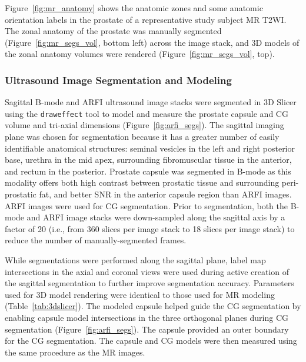 

Figure~\ref{fig:mr_anatomy} shows the anatomic zones and some anatomic
orientation labels in the prostate of a representative study subject MR T2WI.
The zonal anatomy of the prostate was manually segmented
(Figure~\ref{fig:mr_segs_vol}, bottom left) across the image stack, and 3D
models of the zonal anatomy volumes were rendered
(Figure~\ref{fig:mr_segs_vol}, top).



\subsubsection{Ultrasound Image Segmentation and Modeling}
Sagittal B-mode and ARFI ultrasound image stacks were segmented in 3D Slicer
using the \verb+draweffect+ tool to model and measure the prostate capsule and
CG volume and tri-axial dimensions (Figure~\ref{fig:arfi_segs}).  The sagittal
imaging plane was chosen for segmentation because it has a greater number of
easily identifiable anatomical structures:  seminal vesicles in the left and
right posterior base, urethra in the mid apex, surrounding fibromuscular tissue
in the anterior, and rectum in the posterior. Prostate capsule was segmented in
B-mode as this modality offers both high contrast between prostatic tissue and
surrounding peri-prostatic fat, and better SNR in the anterior capsule region
than ARFI images. ARFI images were used for CG segmentation.  Prior to
segmentation, both the B-mode and ARFI image stacks were down-sampled along the
sagittal axis by a factor of 20 (i.e., from 360 slices per image stack to 18
slices per image stack) to reduce the number of manually-segmented frames. 

While segmentations were performed along the sagittal plane, label map
intersections in the axial and coronal views were used during active creation
of the sagittal segmentation to further improve segmentation accuracy.
Parameters used for 3D model rendering were identical to those used for MR
modeling (Table~\ref{tab:3dslicer}).  The modeled capsule helped guide the CG
segmentation by enabling capsule model intersections in the three orthogonal
planes during CG segmentation (Figure~\ref{fig:arfi_segs}). The capsule provided
an outer boundary for the CG segmentation. The capsule and CG models were then
measured using the same procedure as the MR images.




